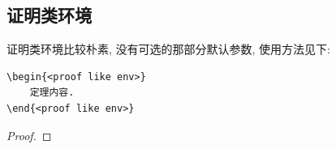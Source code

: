 \begin{lemma}
    \boomen \par 
    \boomcn
\end{lemma}

\begin{remark}
    \boomen \par 
    \boomcn
\end{remark}


\begin{axiom}
    \boomen \par 
    \boomcn
\end{axiom}

\begin{proposition}
    \boomen \par 
    \boomcn
\end{proposition}

\begin{theorem}\label{thm:test}
    \boomen \par 
    \boomcn
\end{theorem}

\begin{definition}
    \boomen \par 
    \boomcn
\end{definition}



\subsection{证明类环境}
证明类环境比较朴素, 没有可选的那部分默认参数, 使用方法见下:
\begin{verbatim}
\begin{<proof like env>}
    定理内容.
\end{<proof like env>}
\end{verbatim}
\vspace*{-2em}

\begin{proof}
    \boomen \par 
    \boomcn
\end{proof}

\begin{example}
    \boomen \par 
    \boomcn
\end{example}


